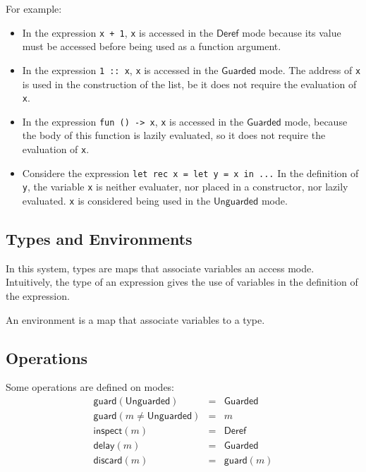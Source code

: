 \documentclass{article}
\newcommand{\Deref}{\mathsf{Deref}}
\newcommand{\Unguarded}{\mathsf{Unguarded}}
\newcommand{\Guarded}{\mathsf{Guarded}}
\newcommand{\inspect}{\mathsf{inspect}}
\newcommand{\guard}{\mathsf{guard}}
\newcommand{\discard}{\mathsf{discard}}
\newcommand{\delay}{\mathsf{delay}}
\begin{document}
For example:
\begin{itemize}
  \item In the expression \lstinline|x + 1|, \lstinline|x| is accessed in the
    $\Deref$ mode because its value must be accessed before being used as
    a function argument.
  \item In the expression \lstinline|1 :: x|, \lstinline|x| is accessed in the
    $\Guarded$ mode. The address of \lstinline|x| is used in the
    construction of the list, be it does not require the evaluation of
    \lstinline|x|.
  \item In the expression \lstinline|fun () -> x|, \lstinline|x| is accessed in
    the $\Guarded$ mode, because the body of this function is lazily
    evaluated, so it does not require the evaluation of \lstinline|x|.
  \item Considere the expression \lstinline |let rec x = let y = x in ...|
    In the definition of \lstinline|y|, the variable \lstinline|x| is neither
    evaluater, nor placed in a constructor, nor lazily evaluated. \lstinline|x|
    is considered being used in the $\Unguarded$ mode.
\end{itemize}

\subsection{Types and Environments}
In this system, types are maps that associate variables an access mode.
Intuitively, the type of an expression gives the use of variables in the
definition of the expression.


An environment is a map that associate variables to a type.

\subsection{Operations}
Some operations are defined on modes:
\begin{displaymath}
  \begin{array}{lll}
    \guard(\Unguarded)              & = & \Guarded \\
    \guard(m \neq \Unguarded)       & = & m        \\
    \inspect(m)                     & = & \Deref   \\
    \delay(m)                       & = & \Guarded \\
    \discard(m)                     & = & \guard(m)
  \end{array}
\end{displaymath}
\end{document}
